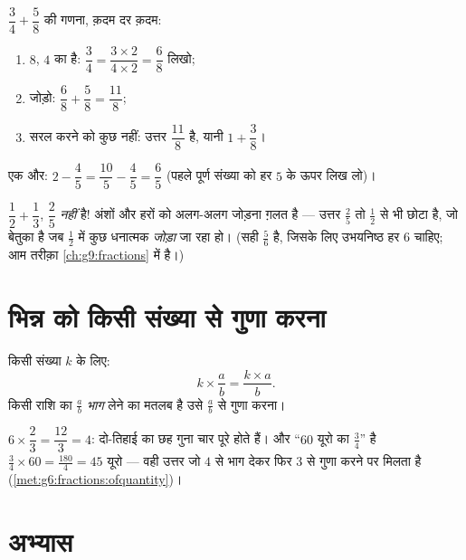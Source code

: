 \begin{example}\label{ex:g7:fractions:add}
$\dfrac{3}{4} + \dfrac{5}{8}$ की गणना, क़दम दर क़दम:
\begin{enumerate}
  \item $8$, $4$ का  है: $\dfrac34 = \dfrac{3 \times 2}{4 \times 2}
        = \dfrac{6}{8}$ लिखो;
  \item जोड़ो: $\dfrac{6}{8} + \dfrac{5}{8} = \dfrac{11}{8}$;
  \item सरल करने को कुछ नहीं: उत्तर $\dfrac{11}{8}$ है, यानी
        $1 + \dfrac38$।
\end{enumerate}
एक और: $2 - \dfrac{4}{5} = \dfrac{10}{5} - \dfrac{4}{5} =
\dfrac{6}{5}$ (पहले पूर्ण संख्या को हर $5$ के ऊपर लिख लो)।
\end{example}

\begin{example}[एक जानी-पहचानी ग़लती]\label{ex:g7:fractions:trap}
$\dfrac12 + \dfrac13$, $\dfrac{2}{5}$ \emph{नहीं} है! अंशों और हरों
को अलग-अलग जोड़ना ग़लत है --- उत्तर $\frac25$ तो $\frac12$ से भी
छोटा है, जो बेतुका है जब $\frac12$ में कुछ धनात्मक \emph{जोड़ा} जा
रहा हो। (सही  $\frac56$ है, जिसके लिए उभयनिष्ठ हर $6$ चाहिए;
आम तरीक़ा \cref{ch:g9:fractions} में है।)
\end{example}

\section{भिन्न को किसी संख्या से गुणा करना}

\begin{proposition}[भिन्न गुना संख्या]\label{prop:g7:fractions:mult}
किसी संख्या $k$ के लिए:
\[
k \times \frac{a}{b} = \frac{k \times a}{b} .
\]
किसी राशि का $\frac ab$ \emph{भाग} लेने का मतलब है उसे $\frac ab$
से गुणा करना।
\end{proposition}
\admitted

\begin{example}\label{ex:g7:fractions:mult}
$6 \times \dfrac{2}{3} = \dfrac{12}{3} = 4$: दो-तिहाई का छह गुना
चार पूरे होते हैं। और ``$60$ यूरो का $\frac34$'' है
$\frac34 \times 60 = \frac{180}{4} = 45$ यूरो --- वही उत्तर जो $4$
से भाग देकर फिर $3$ से गुणा करने पर मिलता है
(\cref{met:g6:fractions:ofquantity})।
\end{example}

\section{अभ्यास}


